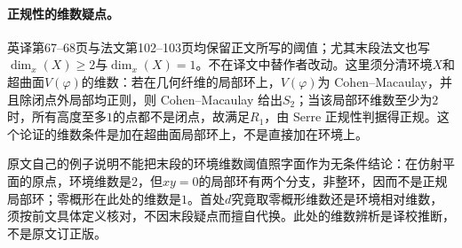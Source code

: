 \documentclass[openany,fontset=fandol]{ctexbook}
\begin{document}
\paragraph{正规性的维数疑点。}
英译第67--68页与法文第102--103页均保留正文所写的阈值；尤其末段法文也写$\dim_x(X)\ge2$与$\dim_x(X)=1$。不在译文中替作者改动。这里须分清环境$X$和超曲面$V(\varphi)$的维数：若在几何纤维的局部环上，$V(\varphi)$为 Cohen--Macaulay，并且除闭点外局部均正则，则 Cohen--Macaulay 给出$S_2$；当该局部环维数至少为$2$时，所有高度至多$1$的点都不是闭点，故满足$R_1$，由 Serre 正规性判据得正规。这个论证的维数条件是加在超曲面局部环上，不是直接加在环境上。

原文自己的例子说明不能把末段的环境维数阈值照字面作为无条件结论：在仿射平面的原点，环境维数是$2$，但$xy=0$的局部环有两个分支，非整环，因而不是正规局部环；零概形在此处的维数是$1$。首处$d$究竟取零概形维数还是环境相对维数，须按前文具体定义核对，不因末段疑点而擅自代换。此处的维数辨析是译校推断，不是原文订正版。
\end{document}

